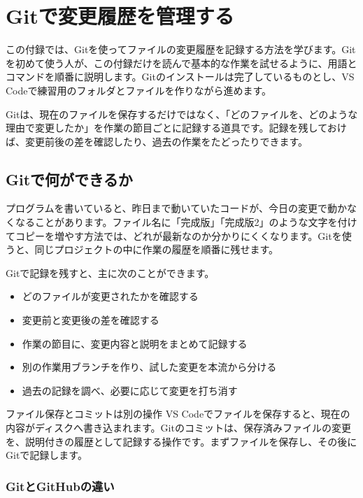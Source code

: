 \chapter{Gitで変更履歴を管理する}
\label{app:git-guide}

この付録では、Gitを使ってファイルの変更履歴を記録する方法を学びます。Gitを初めて使う人が、この付録だけを読んで基本的な作業を試せるように、用語とコマンドを順番に説明します。Gitのインストールは完了しているものとし、VS Codeで練習用のフォルダとファイルを作りながら進めます。

Gitは、現在のファイルを保存するだけではなく、「どのファイルを、どのような理由で変更したか」を作業の節目ごとに記録する道具です。記録を残しておけば、変更前後の差を確認したり、過去の作業をたどったりできます。

\section{Gitで何ができるか}

プログラムを書いていると、昨日まで動いていたコードが、今日の変更で動かなくなることがあります。ファイル名に「完成版」「完成版2」のような文字を付けてコピーを増やす方法では、どれが最新なのか分かりにくくなります。Gitを使うと、同じプロジェクトの中に作業の履歴を順番に残せます。

Gitで記録を残すと、主に次のことができます。

\begin{itemize}
    \item どのファイルが変更されたかを確認する
    \item 変更前と変更後の差を確認する
    \item 作業の節目に、変更内容と説明をまとめて記録する
    \item 別の作業用ブランチを作り、試した変更を本流から分ける
    \item 過去の記録を調べ、必要に応じて変更を打ち消す
\end{itemize}

\begin{pointbox}{ファイル保存とコミットは別の操作}
VS Codeでファイルを保存すると、現在の内容がディスクへ書き込まれます。Gitのコミットは、保存済みファイルの変更を、説明付きの履歴として記録する操作です。まずファイルを保存し、その後にGitで記録します。
\end{pointbox}

\subsection{GitとGitHubの違い}

